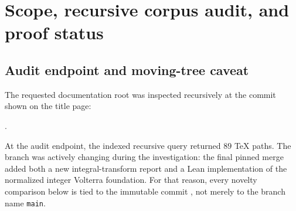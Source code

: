 \documentclass[11pt,oneside]{article}
\theoremstyle{definition}
\theoremstyle{remark}
\newcommand{\Up}{\operatorname{up}}
\newcommand{\dd}{\,\mathrm d}
\newcommand{\1}{\mathbf 1}
\begin{document}
\begin{abstract}
The transform side is organized by the entire complex-order generalized
Stieltjes function
\[
 S_\lambda(z)=\int_{-1}^1\frac{\Up(t)}{(z-t)^\lambda}\dd t.
\]
It obeys a dyadic order-lowering equation, an exact derivative hierarchy, and
an even-moment series.  It also controls nonlocal operators.  For
$0<\beta<2$ and $|x|>1$,
\[
 (-\Delta)^{\beta/2}\Up(x)
 =-C_{1,\beta}S_{1+\beta}(|x|),
\]
so the exterior fractional Laplacian has a full rational-moment expansion.
A parallel formula is proved for Riesz potentials.  Numerical Fourier
experiments suggest that $(-\Delta)^{\beta/2}\Up$ has exactly one positive
zero for every $0<\beta<2$; this is stated explicitly as a conjecture.

The report also develops complex-order resolvents containing $F$ and $Q$,
fractional autocorrelation energies of the infinite sinc product, a catalog
of definite and indefinite integral identities, reproducible numerical
checks, and a Lean formalization roadmap.  ``New'' throughout means new
relative to the pinned repository corpus after a targeted collision audit;
it is not a claim of universal publication priority.
\end{abstract}


\clearpage

\section{Scope, recursive corpus audit, and proof status}
\label{p9:sec:audit}

\subsection{Audit endpoint and moving-tree caveat}

The requested documentation root was inspected recursively at the commit
shown on the title page:
\begin{center}
\RepoRoot.
\end{center}
At the audit endpoint, the indexed recursive query returned $89$ TeX paths.
The branch was actively changing during the investigation: the final pinned
merge added both a new integral-transform report and a Lean implementation of
the normalized integer Volterra foundation.  For that reason, every novelty
comparison below is tied to the immutable commit \RepoCommit, not merely to
the branch name \texttt{main}.
\end{document}
